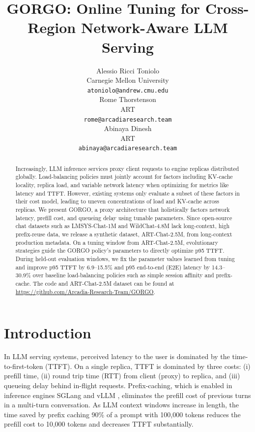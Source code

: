 \documentclass{article}
\title{GORGO: Online Tuning for Cross-Region Network-Aware LLM Serving}
\author{
  Alessio Ricci Toniolo \\
  Carnegie Mellon University \\
  \texttt{atoniolo@andrew.cmu.edu} \\
  \And
  Rome Thorstenson \\
  ART \\
  \texttt{rome@arcadiaresearch.team} \\
  \And
  Abinaya Dinesh \\
  ART \\
  \texttt{abinaya@arcadiaresearch.team} \\
}
\begin{document}
\maketitle

\begin{abstract}
Increasingly, LLM inference services proxy client requests to engine replicas distributed globally.
Load-balancing policies must jointly account for
factors including KV-cache locality, replica load, and variable network latency when
optimizing for metrics like latency and TTFT.
However, existing systems only evaluate a subset of these factors in their cost
model, leading to uneven concentrations of load and KV-cache across replicas. We
present GORGO, a proxy architecture that holistically factors network latency,
prefill cost, and queueing delay using tunable parameters. Since open-source chat
datasets such as LMSYS-Chat-1M and WildChat-4.8M lack long-context, high
prefix-reuse data, we release a synthetic dataset, ART-Chat-2.5M, from
long-context production metadata. On a tuning window from ART-Chat-2.5M,
evolutionary strategies guide the GORGO policy's parameters to directly optimize
p95 TTFT. During held-out evaluation windows, we fix the parameter values learned
from tuning and improve p95 TTFT by 6.9--15.5\% and p95 end-to-end (E2E) latency by
14.3--30.9\% over baseline load-balancing policies such as simple session affinity
and prefix-cache.
The code and ART-Chat-2.5M dataset can be found at \href{https://github.com/Arcadia-Research-Team/GORGO}{https://github.com/Arcadia-Research-Team/GORGO}.
\end{abstract}

\section{Introduction}
\label{sec:intro}

In LLM serving systems, perceived latency to the user is dominated by the time-to-first-token (TTFT). On a single replica, TTFT is dominated by three costs: (i) prefill time, (ii) round trip time (RTT) from client (proxy) to replica, and (iii) queueing delay behind in-flight requests. Prefix-caching, which is enabled in inference engines SGLang \citep{sglang2024} and vLLM \citep{vllm2023}, eliminates the prefill cost of previous turns in a multi-turn conversation. As LLM context windows increase in length, the time saved by prefix caching 90\% of a prompt with 100,000 tokens reduces the prefill cost to 10,000 tokens and decreases TTFT substantially.
\end{document}
